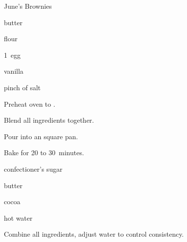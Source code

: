 \begin{recipe}{June's Brownies}{}{}

\begin{ingredients}
\item \C{\half} 
\item \C{\half} butter
\item \C{\half} flour
\item 1~egg
\item {} vanilla
\item pinch of salt
\item {} 
\end{ingredients}

\begin{directions}
\item Preheat oven to .
\item Blend all ingredients together.
\item Pour into an  square pan.
\item Bake for 20 to 30~minutes.
\end{directions}

\begin{ingredients}
\item {} confectioner's sugar
\item \C{\half} butter
\item {} cocoa
\item \C{\quarter} hot water
\end{ingredients}

\begin{directions}
\item Combine all ingredients, adjust water to control consistency.
\end{directions}

\end{recipe}
